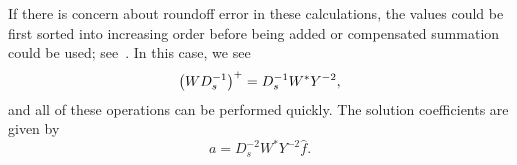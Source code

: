 \noindent
If there is concern about roundoff error in these calculations,
the values could be first sorted into increasing order before
being added or compensated summation could be used;
see~\cite[Chapter 4]{HighamASNA}.
In this case, we see
%
\begin{equation}
    \left( WD_{s}^{-1} \right)^{+} = D_{s}^{-1}W^{*}Y^{-2},
\end{equation}
%
and all of these operations can be performed quickly.
The solution coefficients are given by
%
\begin{equation}
    a = D_{s}^{-2}W^{*}Y^{-2}\hat{f}.
\end{equation}


